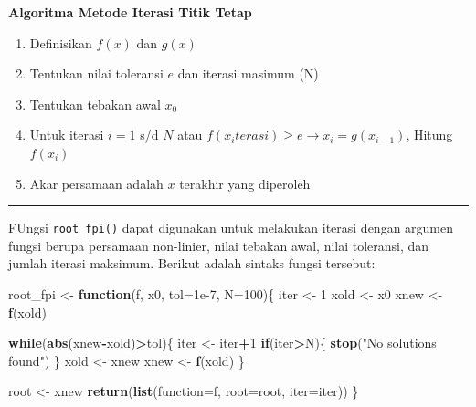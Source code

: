 \documentclass[
]{book}
\newenvironment{Shaded}{\begin{snugshade}}{\end{snugshade}}
\newcommand{\AttributeTok}[1]{\textcolor[rgb]{0.13,0.29,0.53}{#1}}
\newcommand{\ControlFlowTok}[1]{\textcolor[rgb]{0.13,0.29,0.53}{\textbf{#1}}}
\newcommand{\DecValTok}[1]{\textcolor[rgb]{0.00,0.00,0.81}{#1}}
\newcommand{\FloatTok}[1]{\textcolor[rgb]{0.00,0.00,0.81}{#1}}
\newcommand{\FunctionTok}[1]{\textcolor[rgb]{0.13,0.29,0.53}{\textbf{#1}}}
\newcommand{\NormalTok}[1]{#1}
\newcommand{\OtherTok}[1]{\textcolor[rgb]{0.56,0.35,0.01}{#1}}
\newcommand{\SpecialCharTok}[1]{\textcolor[rgb]{0.81,0.36,0.00}{\textbf{#1}}}
\newcommand{\StringTok}[1]{\textcolor[rgb]{0.31,0.60,0.02}{#1}}
\providecommand{\tightlist}{%
  \setlength{\itemsep}{0pt}\setlength{\parskip}{0pt}}
\theoremstyle{definition}
\theoremstyle{definition}
\theoremstyle{definition}
\theoremstyle{definition}
\theoremstyle{remark}
\begin{document}
\textbf{Algoritma Metode Iterasi Titik Tetap}

\begin{enumerate}
\def\labelenumi{\arabic{enumi}.}
\tightlist
\item
  Definisikan \(f\left(x \right)\) dan \(g\left(x \right)\)
\item
  Tentukan nilai toleransi \(e\) dan iterasi masimum (N)
\item
  Tentukan tebakan awal \(x_0\)
\item
  Untuk iterasi \(i=1\) s/d \(N\) atau \(f\left(x_iterasi \right)\ge e \to x_i=g\left(x_{i-1} \right)\), Hitung \(f\left(x_i \right)\)
\item
  Akar persamaan adalah \(x\) terakhir yang diperoleh
\end{enumerate}

\begin{center}\rule{0.5\linewidth}{0.5pt}\end{center}

FUngsi \texttt{root\_fpi()} dapat digunakan untuk melakukan iterasi dengan argumen fungsi berupa persamaan non-linier, nilai tebakan awal, nilai toleransi, dan jumlah iterasi maksimum. Berikut adalah sintaks fungsi tersebut:

\begin{Shaded}
\begin{Highlighting}[]
\NormalTok{root\_fpi }\OtherTok{\textless{}{-}} \ControlFlowTok{function}\NormalTok{(f, x0, }\AttributeTok{tol=}\FloatTok{1e{-}7}\NormalTok{, }\AttributeTok{N=}\DecValTok{100}\NormalTok{)\{}
\NormalTok{  iter }\OtherTok{\textless{}{-}} \DecValTok{1}
\NormalTok{  xold }\OtherTok{\textless{}{-}}\NormalTok{ x0}
\NormalTok{  xnew }\OtherTok{\textless{}{-}} \FunctionTok{f}\NormalTok{(xold)}
  
  \ControlFlowTok{while}\NormalTok{(}\FunctionTok{abs}\NormalTok{(xnew}\SpecialCharTok{{-}}\NormalTok{xold)}\SpecialCharTok{\textgreater{}}\NormalTok{tol)\{}
\NormalTok{    iter }\OtherTok{\textless{}{-}}\NormalTok{ iter}\SpecialCharTok{+}\DecValTok{1}
    \ControlFlowTok{if}\NormalTok{(iter}\SpecialCharTok{\textgreater{}}\NormalTok{N)\{}
      \FunctionTok{stop}\NormalTok{(}\StringTok{"No solutions found"}\NormalTok{)}
\NormalTok{    \}}
\NormalTok{    xold }\OtherTok{\textless{}{-}}\NormalTok{ xnew}
\NormalTok{    xnew }\OtherTok{\textless{}{-}} \FunctionTok{f}\NormalTok{(xold)}
\NormalTok{  \}}
  
\NormalTok{  root }\OtherTok{\textless{}{-}}\NormalTok{ xnew}
  \FunctionTok{return}\NormalTok{(}\FunctionTok{list}\NormalTok{(}\StringTok{\textasciigrave{}}\AttributeTok{function}\StringTok{\textasciigrave{}}\OtherTok{=}\NormalTok{f, }\AttributeTok{root=}\NormalTok{root, }\AttributeTok{iter=}\NormalTok{iter))}
\NormalTok{\}}
\end{Highlighting}
\end{Shaded}
\end{document}
